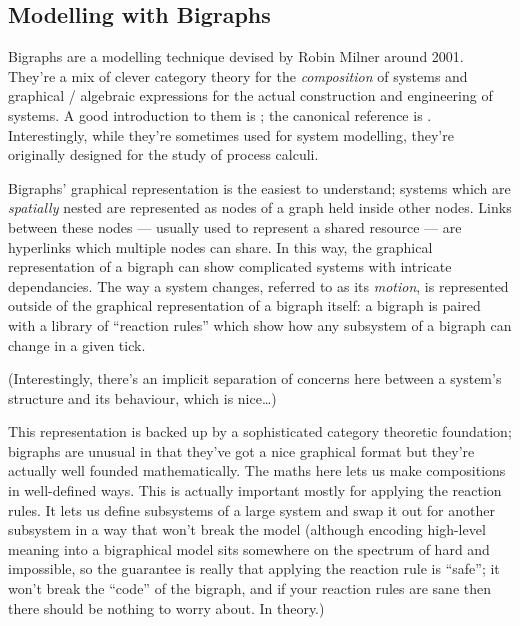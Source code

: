 \documentclass{article}
\begin{document}
\subsection{Modelling with Bigraphs}

Bigraphs are a modelling technique devised by Robin Milner around 2001. They're a mix of clever category theory for the
\emph{composition} of systems and graphical / algebraic expressions for the actual construction and engineering of
systems. A good introduction to them is \cite{milner:bigraphsandtheiralgebra}; the canonical reference is
\cite{milner:spaceandmotion}. Interestingly, while they're sometimes used for system modelling, they're originally
designed for the study of process calculi.\par

Bigraphs' graphical representation is the easiest to understand; systems which are \emph{spatially} nested are
represented as nodes of a graph held inside other nodes. Links between these nodes --- usually used to represent a
shared resource --- are hyperlinks which multiple nodes can share. In this way, the graphical representation of a
bigraph can show complicated systems with intricate dependancies. The way a system changes, referred to as its
\emph{motion}, is represented outside of the graphical representation of a bigraph itself: a bigraph is paired with a
library of ``reaction rules'' which show how any subsystem of a bigraph can change in a given tick.\par

(Interestingly, there's an implicit separation of concerns here between a system's structure and its behaviour, which is
nice\ldots{})\par

This representation is backed up by a sophisticated category theoretic foundation; bigraphs are unusual in that they've
got a nice graphical format but they're actually well founded mathematically. The maths here lets us make compositions
in well-defined ways. This is actually important mostly for applying the reaction rules. It lets us define subsystems of
a large system and swap it out for another subsystem in a way that won't break the model (although encoding high-level
meaning into a bigraphical model sits somewhere on the spectrum of hard and impossible, so the guarantee is really that
applying the reaction rule is ``safe''; it won't break the ``code'' of the bigraph, and if your reaction rules are sane
then there should be nothing to worry about. In theory.)\par
\end{document}
